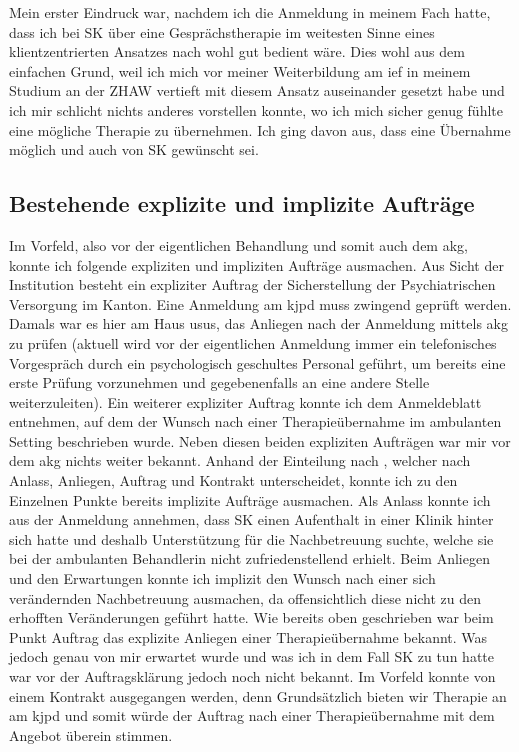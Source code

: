 Mein erster Eindruck war, nachdem ich die Anmeldung in meinem Fach hatte, dass ich bei SK über eine Gesprächstherapie im weitesten Sinne eines klientzentrierten Ansatzes nach  wohl gut bedient wäre. Dies wohl aus dem einfachen Grund, weil ich mich vor meiner Weiterbildung am \ac{ief} in meinem Studium an der ZHAW vertieft mit diesem Ansatz auseinander gesetzt habe und ich mir schlicht nichts anderes vorstellen konnte, wo ich mich sicher genug fühlte eine mögliche Therapie zu übernehmen. Ich ging  davon aus, dass eine Übernahme möglich und auch von SK gewünscht sei. 

\subsection{Bestehende explizite und implizite Aufträge} 
Im Vorfeld, also vor der eigentlichen Behandlung und somit auch dem \ac{akg}, konnte ich folgende expliziten und impliziten Aufträge ausmachen. Aus Sicht der Institution besteht ein expliziter Auftrag der Sicherstellung der Psychiatrischen Versorgung im Kanton. Eine Anmeldung am \ac{kjpd} muss zwingend geprüft werden. Damals war es hier am Haus usus, das Anliegen nach der Anmeldung mittels \ac{akg} zu prüfen (aktuell wird vor der eigentlichen Anmeldung immer ein telefonisches Vorgespräch durch ein psychologisch geschultes Personal geführt, um bereits eine erste Prüfung vorzunehmen und gegebenenfalls an eine andere Stelle weiterzuleiten). Ein weiterer expliziter Auftrag konnte ich dem Anmeldeblatt entnehmen, auf dem der Wunsch nach einer Therapieübernahme im ambulanten Setting beschrieben wurde. Neben diesen beiden expliziten Aufträgen war mir vor dem \ac{akg} nichts weiter bekannt. Anhand der Einteilung nach , welcher nach Anlass, Anliegen, Auftrag und Kontrakt unterscheidet, konnte ich zu den Einzelnen Punkte bereits implizite Aufträge ausmachen. Als Anlass konnte ich aus der Anmeldung annehmen, dass SK einen Aufenthalt in einer Klinik hinter sich hatte und deshalb Unterstützung für die Nachbetreuung suchte, welche sie bei der ambulanten Behandlerin nicht zufriedenstellend erhielt. Beim Anliegen und den Erwartungen konnte ich implizit den Wunsch nach einer sich verändernden Nachbetreuung ausmachen, da offensichtlich diese nicht zu den erhofften Veränderungen geführt hatte. Wie bereits oben geschrieben war beim Punkt Auftrag das explizite Anliegen einer Therapieübernahme bekannt. Was jedoch genau von mir erwartet wurde und was ich in dem Fall SK zu tun hatte war vor der Auftragsklärung jedoch noch nicht bekannt. Im Vorfeld konnte von einem Kontrakt ausgegangen werden, denn Grundsätzlich bieten wir Therapie an am \ac{kjpd} und somit würde der Auftrag nach einer Therapieübernahme mit dem Angebot überein stimmen.  

